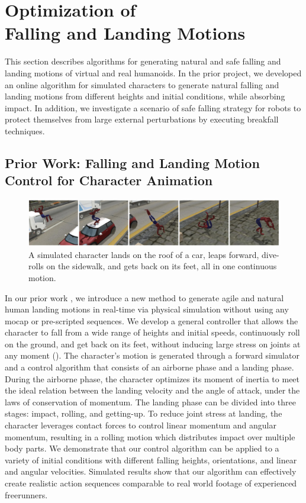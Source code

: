 \chapter{Optimization of \protect\\ Falling and Landing Motions}

This section describes algorithms for generating natural and safe
falling and landing motions of virtual and real humanoids.
In the prior project, we developed an online algorithm for simulated 
characters to generate natural falling and landing motions from 
different heights and initial conditions, while absorbing impact.
In addition, we investigate a scenario of safe falling 
strategy for robots to protect themselves from large external 
perturbations by executing breakfall techniques.

\section{Prior Work: Falling and Landing Motion Control for Character Animation}

\begin{figure}[htbp]
\center
  \includegraphics[width=\linewidth]{images/falling1_teaser}
  \caption{A simulated character lands on the roof of a car, 
    leaps forward, dive-rolls on the sidewalk, 
    and gets back on its feet, all in one continuous motion.}
 \label{fig:landingOverview}
\end{figure}

In our prior work \cite{Ha:2012:FAL}, 
we introduce a new method to generate agile and natural human landing
motions in real-time via physical simulation without using any mocap
or pre-scripted sequences. We develop a general controller that allows
the character to fall from a wide range of heights and initial speeds,
continuously roll on the ground, and get back on its feet, without
inducing large stress on joints at any moment 
().
The character's motion
is generated through a forward simulator and a control algorithm that
consists of an airborne phase and a landing phase. During the airborne
phase, the character optimizes its moment of inertia to meet the ideal
relation between the landing velocity and the angle of attack, under
the laws of conservation of momentum. The landing phase can be divided
into three stages: impact, rolling, and getting-up. To reduce joint
stress at landing, the character leverages contact forces to control
linear momentum and angular momentum, resulting in a rolling motion
which distributes impact over multiple body parts. We demonstrate that
our control algorithm can be applied to a variety of initial
conditions with different falling heights, orientations, and linear
and angular velocities. Simulated results show that our algorithm can
effectively create realistic action sequences comparable to real world
footage of experienced freerunners.


